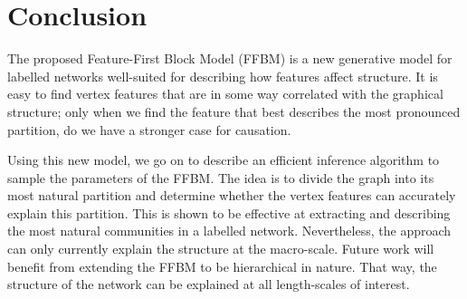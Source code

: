 \section{Conclusion}
\label{sec:conclusion}

The proposed Feature-First Block Model (FFBM)
is a new generative model for labelled networks well-suited for describing how features
affect structure.
It is easy to find vertex features that are in some way 
correlated with the graphical structure; only when 
we find the feature that best describes the most pronounced partition,
do we have a stronger case for causation.

Using this new model,
we go on to describe an efficient inference algorithm to sample 
the parameters of the FFBM.
The idea is to divide the graph into its most natural partition and determine whether 
the vertex features can accurately explain this partition. 
This is shown to be effective at extracting and describing 
the most natural communities in a labelled network. Nevertheless, the approach 
can only currently explain the structure at the macro-scale. Future work will benefit from extending 
the FFBM to be hierarchical in nature. That way, the structure of the network 
can be explained at all length-scales of interest.
